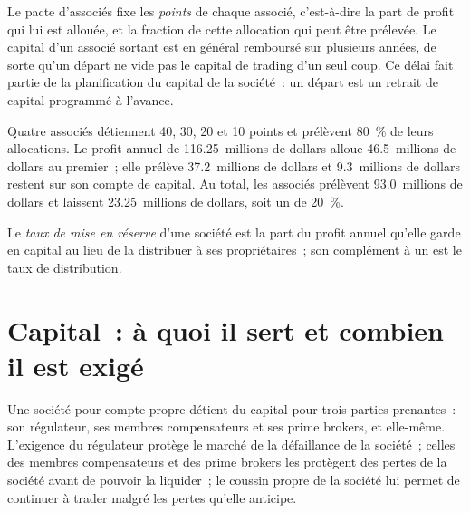 Le pacte d'associés fixe les \emph{points} de chaque associé, c'est-à-dire la part de profit qui lui est allouée, et la fraction de cette allocation qui peut être prélevée. Le
capital d'un associé sortant est en général remboursé sur plusieurs années, de sorte qu'un départ ne vide pas le capital de trading d'un seul coup. Ce délai fait
partie de la planification du capital de la société~: un départ est un retrait de capital programmé à l'avance.

\begin{example}\label{ex:fm:the-proprietary-market-making-firm:alloc}
Quatre associés détiennent 40, 30, 20 et 10 points et prélèvent 80~\% de leurs allocations. Le profit annuel de 116.25~millions de dollars alloue 46.5~millions de dollars au
premier~; elle prélève 37.2~millions de dollars et 9.3~millions de dollars restent sur son compte de capital. Au total, les associés prélèvent 93.0~millions de dollars et laissent 23.25~millions de dollars,
soit un  de 20~\%.
\end{example}

\begin{definition}\label{def:fm:the-proprietary-market-making-firm:retention}
Le \emph{taux de mise en réserve} d'une société est la part du profit annuel qu'elle garde en capital au lieu de la distribuer à ses propriétaires~;
son complément à un est le taux de distribution.
\end{definition}

\section{Capital~: à quoi il sert et combien il est exigé}

Une société pour compte propre détient du capital pour trois parties prenantes~: son régulateur, ses membres compensateurs et ses prime brokers, et elle-même. L'exigence du régulateur
protège le marché de la défaillance de la société~; celles des membres compensateurs et des prime brokers les protègent des pertes de la société avant de pouvoir
la liquider~; le coussin propre de la société lui permet de continuer à trader malgré les pertes qu'elle anticipe.

